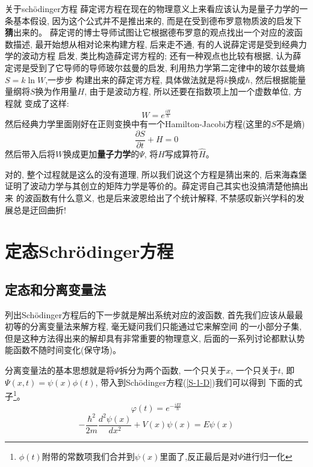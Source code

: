 \documentclass[a4paper,zihao=-4,linespread=1]{ctexrep}
\newenvironment{lequation}{\large\begin{equation}}{\end{equation}}
\begin{document}
    \begin{history}{关于sch\"{o}dinger方程}
        薛定谔方程在现在的物理意义上来看应该认为是量子力学的一条基本假设, 因为这个公式并不是推出来的, 而是在受到德布罗意物质波的启发下\textbf{猜}出来的。
        薛定谔的博士导师试图让它根据德布罗意的观点找出一个对应的波函数描述, 最开始想从相对论来构建方程, 后来走不通, 有的人说薛定谔是受到经典力学的波动方程
        启发, 类比构造薛定谔方程的; 还有一种观点也比较有根据, 认为薛定谔是受到了它导师的导师玻尔兹曼的启发, 利用热力学第二定律中的玻尔兹曼熵$S=k\ln W$,一步步
        构建出来的薛定谔方程, 具体做法就是将$k$换成$\hbar$, 然后根据能量量纲将$S$换为作用量$H$, 由于是波动方程, 所以还要在指数项上加一个虚数单位, 方程就
        变成了这样:$$W=e^{\frac{iH}{\hbar}}$$然后经典力学里面刚好在正则变换中有一个Hamilton-Jacobi方程(这里的$S$不是熵)$$\frac{\partial S}{\partial t}+H=0$$
        然后带入后将$W$换成更加\textbf{量子力学}的$\Psi$, 将$H$写成算符$\hat{H}$。

        对的, 整个过程就是这么的没有道理, 所以我们说这个方程是猜出来的, 后来海森堡证明了波动力学与其创立的矩阵力学是等价的。薛定谔自己其实也没搞清楚他搞出来
        的波函数有什么意义, 也是后来波恩给出了个统计解释, 不禁感叹新兴学科的发展总是迂回曲折!
    \end{history}
    \newpage
    \chapter{定态Schr\"{o}dinger方程}
    \section{定态和分离变量法}
    列出Sch\"{o}dinger方程后的下一步就是解出系统对应的波函数, 首先我们应该从最最初等的分离变量法来解方程, 毫无疑问我们只能通过它来解空间
    的一小部分子集, 但是这种方法得出来的解却具有非常重要的物理意义, 后面的一系列讨论都默认势能函数不随时间变化(保守场)。

    分离变量法的基本思想就是将$\Psi$拆分为两个函数, 一个只关于$x$, 一个只关于$t$, 即$\Psi(x,t)=\psi(x)\phi(t)$, 带入到Sch\"{o}dinger方程(\ref{S-1-D})我们可以得到
    下面的式子\footnote[1]{$\phi(t)$附带的常数项我们合并到$\psi(x)$里面了,反正最后是对$\Psi$进行归一化}。
    \begin{lequation}
        \label{wiggle-function}
        \boxed{
            \varphi(t)=e^{-\frac{iEt}{\hbar}}
        }
    \end{lequation}
    \begin{lequation}
        \label{time-independent-equation}
        \boxed{
            -\frac{\hbar^2}{2m}\frac{d^2\psi(x)}{dx^2}+V(x)\psi(x)=E\psi(x)
        }
    \end{lequation}
\end{document}
